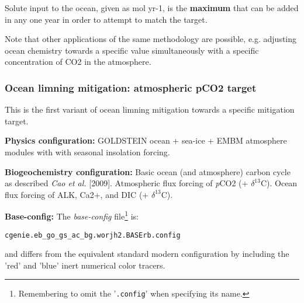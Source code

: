 \documentclass[10pt,twoside]{article}
\begin{document}
Solute input to the ocean, given as mol yr-1, is the \textbf{maximum} that can be added in any one year in order to attempt to match the target.

Note that other applications of the same methodology are possible, e.g. adjusting ocean chemistry towards a specific value simultaneously with a specific concentration of CO2 in the atmosphere.


\subsubsection{Ocean limning mitigation: atmospheric pCO2 target}\label{EXAMPLE.worjh2.LIMNING.pCO2target}

This is the first variant of ocean limning mitigation towards a specific mitigation target.

\noindent \textbf{Physics configuration:} GOLDSTEIN ocean + sea-ice + EMBM atmosphere modules with with seasonal insolation forcing.

\noindent \textbf{Biogeochemistry configuration:} Basic ocean (and atmosphere) carbon cycle as described \textit{Cao et al.} [2009]. Atmospheric flux forcing of \textit{p}CO2 (+ $\delta^{13}$C). Ocean flux forcing of ALK, Ca2+, and  DIC (+ $\delta^{13}$C).

\noindent \textbf{Base-config:} The \textit{base-config} file\footnote{Remembering to omit the '\texttt{.config}' when specifying its name.} is:
\vspace{-10pt}\begin{verbatim}cgenie.eb_go_gs_ac_bg.worjh2.BASErb.config\end{verbatim}\vspace{-10pt}
and differs from the equivalent standard modern configuration by including the 'red' and 'blue' inert numerical color tracers.
\end{document}
